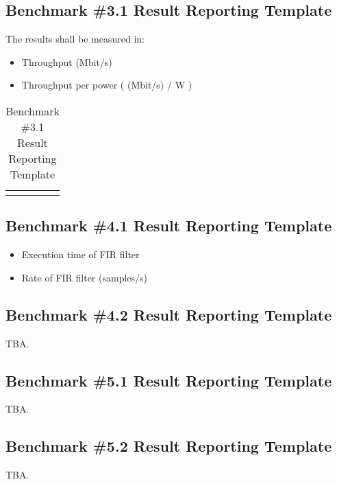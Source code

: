 \newpage
\subsection{Benchmark \#3.1 Result Reporting Template}

The results shall be measured in:

\begin{itemize}
    \item Throughput (Mbit/s)
    \item Throughput per power ( (Mbit/s) / W )
\end{itemize}


\begin{table}[!h]
    \centering
    \begin{tabular}{|c|c|}
        \hline
         &  \\ \hline
         &  \\ \hline
    \end{tabular}
    \caption{Benchmark \#3.1 Result Reporting Template}
    \label{tab:bm3_1_report_template}
\end{table}

\newpage
\subsection{Benchmark \#4.1 Result Reporting Template}

\begin{itemize}
    \item Execution time of FIR filter 
    \item Rate of FIR filter (samples/s)
\end{itemize}

\subsection{Benchmark \#4.2 Result Reporting Template}
TBA.

\subsection{Benchmark \#5.1 Result Reporting Template}
TBA.

\subsection{Benchmark \#5.2 Result Reporting Template}
TBA.